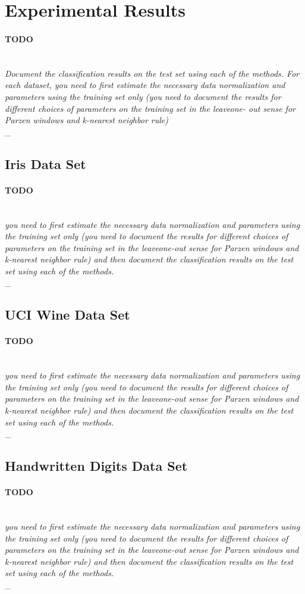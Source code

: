 \documentclass{article}
\newcommand{\outline}[2]{\paragraph{\textsc{#1}}\hrulefill~\\{\small\it #2}\\\_\hrulefill~\\}
\newcommand{\todo}[1]{\outline{\large TODO}{#1}}
\begin{document}
\section{Experimental Results}
\todo{Document the classification results on the test set using each of the methods. For each dataset, you need to first estimate the necessary data normalization and parameters using the training set only (you need to document the results for different choices of parameters on the training set in the leaveone- out sense for Parzen windows and k-nearest neighbor rule)}

\subsection{Iris Data Set}
\todo{you need to first estimate the necessary data normalization and parameters using the training set only (you need to document the results for different choices of parameters on the training set in the leaveone-out sense for Parzen windows and k-nearest neighbor rule) and then document the classification results on
the test set using each of the methods.}

\subsection{UCI Wine Data Set}
\todo{you need to first estimate the necessary data normalization and parameters using the training set only (you need to document the results for different choices of parameters on the training set in the leaveone-out sense for Parzen windows and k-nearest neighbor rule) and then document the classification results on
the test set using each of the methods.}

\subsection{Handwritten Digits Data Set}
\todo{you need to first estimate the necessary data normalization and parameters using the training set only (you need to document the results for different choices of parameters on the training set in the leaveone-out sense for Parzen windows and k-nearest neighbor rule) and then document the classification results on
the test set using each of the methods.}

\end{document}
